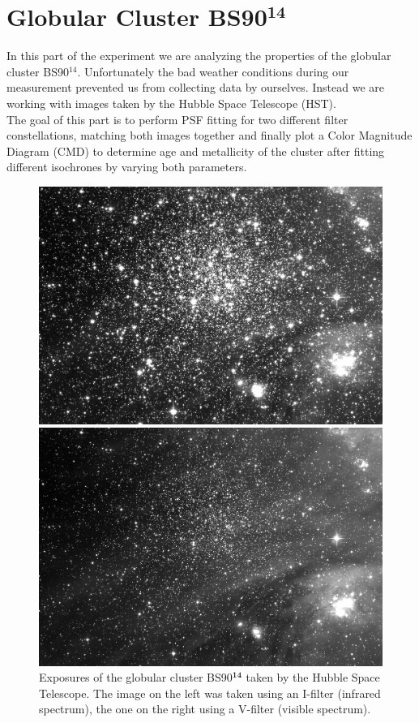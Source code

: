 \chapter{Globular Cluster BS90$^{\mathbf{14}}$}
In this part of the experiment we are analyzing the properties of the globular cluster BS90$^{14}$. Unfortunately the bad weather conditions during our measurement prevented us from collecting data by ourselves. Instead we are working with images taken by the Hubble Space Telescope (HST).\\
The goal of this part is to perform PSF fitting for two different filter constellations, matching both images together and finally plot a Color Magnitude Diagram (CMD) to determine age and metallicity of the cluster after fitting different isochrones by varying both parameters.
\begin{figure}[H]
\begin{minipage}{0.49\textwidth}
	\includegraphics[scale = 0.085]{figures/Exposures/BS90_I}
\end{minipage}
\hfill
\begin{minipage}{0.49\textwidth}
\includegraphics[scale = 0.085]{figures/Exposures/BS90_V}
\end{minipage}
\caption{Exposures of the globular cluster BS90$^{\mathbf{14}}$ taken by the Hubble Space Telescope. The image on the left was taken using an I-filter (infrared spectrum), the one on the right using a V-filter (visible spectrum).}
\end{figure}

